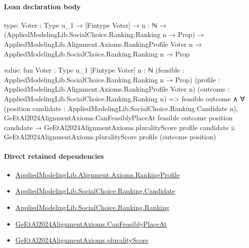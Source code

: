 \documentclass[10pt]{article}
\begin{document}
\paragraph{Lean declaration body}
\begin{ReviewVerbatim}
type:
{Voter : Type u_1} →
  [Fintype Voter] →
    {n : ℕ} →
      (AppliedModelingLib.SocialChoice.Ranking.Ranking n → Prop) →
        AppliedModelingLib.Alignment.Axioms.RankingProfile Voter n →
          AppliedModelingLib.SocialChoice.Ranking.Ranking n → Prop

value:
fun {Voter : Type u_1} [Fintype Voter] {n : ℕ} (feasible : AppliedModelingLib.SocialChoice.Ranking.Ranking n → Prop)
    (profile : AppliedModelingLib.Alignment.Axioms.RankingProfile Voter n)
    (outcome : AppliedModelingLib.SocialChoice.Ranking.Ranking n) =>
  feasible outcome ∧
    ∀ (position candidate : AppliedModelingLib.SocialChoice.Ranking.Candidate n),
      GeEtAl2024AlignmentAxioms.CanFeasiblyPlaceAt feasible outcome position candidate →
        GeEtAl2024AlignmentAxioms.pluralityScore profile candidate ≤
          GeEtAl2024AlignmentAxioms.pluralityScore profile (outcome position)
\end{ReviewVerbatim}

\paragraph{Direct retained dependencies}
\begin{itemize}\raggedright
\item \hyperlink{library-prerequisite-9bded048a60dfe0a}{Applied\allowbreak{}Modeling\allowbreak{}Lib.\allowbreak{}Alignment.\allowbreak{}Axioms.\allowbreak{}Ranking\allowbreak{}Profile}
\item \hyperlink{library-prerequisite-8c0e6c25845ae78a}{Applied\allowbreak{}Modeling\allowbreak{}Lib.\allowbreak{}Social\allowbreak{}Choice.\allowbreak{}Ranking.\allowbreak{}Candidate}
\item \hyperlink{library-prerequisite-5cde54446d1ae021}{Applied\allowbreak{}Modeling\allowbreak{}Lib.\allowbreak{}Social\allowbreak{}Choice.\allowbreak{}Ranking.\allowbreak{}Ranking}
\item \hyperlink{governing-declaration-caf8e44bbfa7b901}{Ge\allowbreak{}Et\allowbreak{}Al2024\allowbreak{}Alignment\allowbreak{}Axioms.\allowbreak{}Can\allowbreak{}Feasibly\allowbreak{}Place\allowbreak{}At}
\item \hyperlink{governing-declaration-8169fe7ec3d0a4b9}{Ge\allowbreak{}Et\allowbreak{}Al2024\allowbreak{}Alignment\allowbreak{}Axioms.\allowbreak{}plurality\allowbreak{}Score}
\end{itemize}
\hypertarget{governing-declaration-49700548e67d8d81}{}
\end{document}
